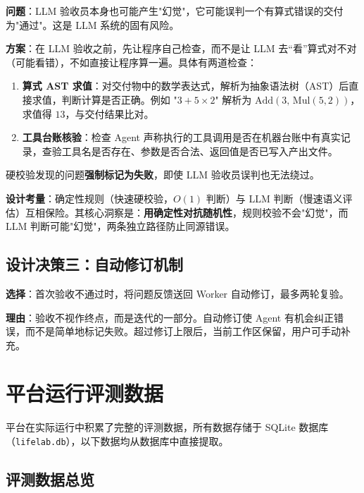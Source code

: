 \documentclass[12pt,a4paper]{article}%
\begin{document}
\textbf{问题}：LLM 验收员本身也可能产生"幻觉"，它可能误判一个有算式错误的交付为"通过"。这是 LLM 系统的固有风险。

\textbf{方案}：在 LLM 验收之前，先让程序自己检查，而不是让 LLM 去“看”算式对不对（可能看错），不如直接让程序算一遍。具体有两道检查：
\begin{enumerate}
	\item \textbf{算式 AST 求值}：对交付物中的数学表达式，解析为抽象语法树（AST）后直接求值，判断计算是否正确。例如 "$3 + 5 \times 2$" 解析为 $\mathrm{Add}(3,\, \mathrm{Mul}(5, 2))$，求值得 $13$，与交付结果比对。
	\item \textbf{工具台账核验}：检查 Agent 声称执行的工具调用是否在机器台账中有真实记录，查验工具名是否存在、参数是否合法、返回值是否已写入产出文件。
\end{enumerate}
硬校验发现的问题\textbf{强制标记为失败}，即使 LLM 验收员误判也无法绕过。

\textbf{设计考量}：确定性规则（快速硬校验，$O(1)$ 判断）与 LLM 判断（慢速语义评估）互相保险。其核心洞察是：\textbf{用确定性对抗随机性}，规则校验不会"幻觉"，而 LLM 判断可能"幻觉"，两条独立路径防止同源错误。

\subsection{设计决策三：自动修订机制}

\textbf{选择}：首次验收不通过时，将问题反馈送回 Worker 自动修订，最多两轮复验。

\textbf{理由}：验收不视作终点，而是迭代的一部分。自动修订使 Agent 有机会纠正错误，而不是简单地标记失败。超过修订上限后，当前工作区保留，用户可手动补充。

\section{平台运行评测数据}

平台在实际运行中积累了完整的评测数据，所有数据存储于 SQLite 数据库（\texttt{lifelab.db}），以下数据均从数据库中直接提取。

\subsection{评测数据总览}
\end{document}
